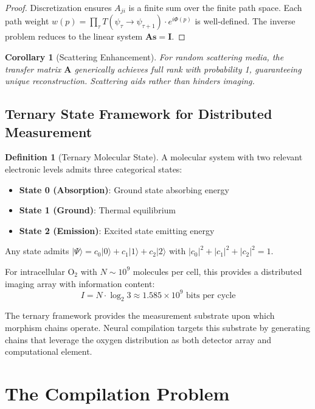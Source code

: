 \documentclass[11pt,twocolumn,a4paper]{article}
\newtheorem{corollary}[theorem]{Corollary}
\theoremstyle{definition}
\newtheorem{definition}[theorem]{Definition}
\theoremstyle{remark}
\begin{document}
\begin{proof}
Discretization ensures $A_{ji}$ is a finite sum over the finite path space. Each path weight $w(p) = \prod_\tau T(\psi_\tau \to \psi_{\tau+1}) \cdot e^{i\Phi(p)}$ is well-defined. The inverse problem reduces to the linear system $\mathbf{A}\mathbf{s} = \mathbf{I}$.
\end{proof}

\begin{corollary}[Scattering Enhancement]
For random scattering media, the transfer matrix $\mathbf{A}$ generically achieves full rank with probability 1, guaranteeing unique reconstruction. Scattering aids rather than hinders imaging.
\end{corollary}

\subsection{Ternary State Framework for Distributed Measurement}

\begin{definition}[Ternary Molecular State]
A molecular system with two relevant electronic levels admits three categorical states:
\begin{itemize}
\item \textbf{State 0 (Absorption)}: Ground state absorbing energy
\item \textbf{State 1 (Ground)}: Thermal equilibrium
\item \textbf{State 2 (Emission)}: Excited state emitting energy
\end{itemize}
Any state admits $|\Psi\rangle = c_0|0\rangle + c_1|1\rangle + c_2|2\rangle$ with $|c_0|^2 + |c_1|^2 + |c_2|^2 = 1$.
\end{definition}

For intracellular O$_2$ with $N \sim 10^9$ molecules per cell, this provides a distributed imaging array with information content:
\begin{equation}
I = N \cdot \log_2 3 \approx 1.585 \times 10^9 \text{ bits per cycle}
\end{equation}

The ternary framework provides the measurement substrate upon which morphism chains operate. Neural compilation targets this substrate by generating chains that leverage the oxygen distribution as both detector array and computational element.

\section{The Compilation Problem}
\label{sec:compilation}
\end{document}
